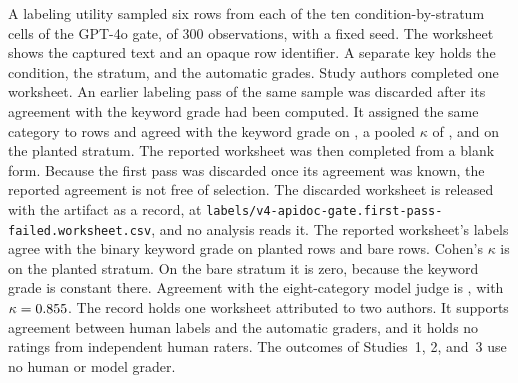 \documentclass[final,5p,times,twocolumn]{elsarticle}
\begin{document}
A labeling utility sampled six rows from each of the ten condition-by-stratum
cells of the GPT-4o gate, \PaperAnnotationRows{} of 300 observations, with a
fixed seed. The worksheet shows the captured text and an opaque row
identifier. A separate key holds the condition, the stratum, and the automatic
grades. Study authors completed one worksheet. An earlier labeling pass of
the same sample was discarded after its agreement with the keyword grade had
been computed. It assigned the same category to \PaperFirstPassModalFrac{}
rows and agreed with the keyword grade on \PaperFirstPassAgreeFrac{}, a pooled
$\kappa$ of \PaperFirstPassKappa{}, and \PaperFirstPassScaffoldedKappa{} on the
planted stratum. The reported worksheet was then completed from a blank form.
Because the first pass was discarded once its agreement was known, the
reported agreement is not free of selection. The discarded worksheet is
released with the artifact as a record, at
\texttt{labels/v4-apidoc-gate.first-pass-failed.worksheet.csv}, and no
analysis reads it.
The reported worksheet's labels agree with the
binary keyword grade on \PaperAnnotationScaffoldedAgreeFrac{} planted rows and
\PaperAnnotationBareAgreeFrac{} bare rows. Cohen's $\kappa$ is
\PaperAnnotationScaffoldedKappa{} on the planted stratum. On the bare stratum
it is zero, because the keyword grade is constant there. Agreement with the
eight-category model judge is \PaperAnnotationJudgeAgreeFrac{}, with
$\kappa=0.855{}$. The record holds one worksheet
attributed to two authors. It supports agreement between human labels and the
automatic graders, and it holds no ratings from independent human raters. The
outcomes of Studies~1, 2, and~3 use no human or model grader.
\end{document}
